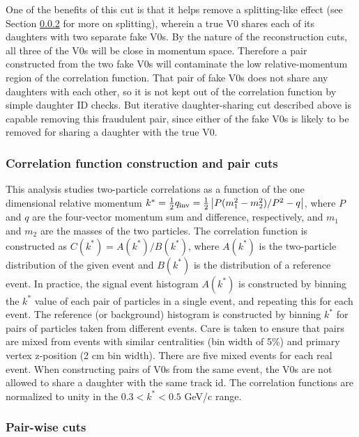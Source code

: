 
One of the benefits of this cut is that it helps remove a splitting-like effect (see Section \ref{sec:PairWiseCuts} for more on splitting), wherein a true V0 shares each of its daughters with two separate fake V0s.  
By the nature of the reconstruction cuts, all three of the V0s will be close in momentum space.  
Therefore a pair constructed from the two fake V0s will contaminate the low relative-momentum region of the correlation function.  
That pair of fake V0s does not share any daughters with each other, so it is not kept out of the correlation function by simple daughter ID checks.  
But iterative daughter-sharing cut described above is capable removing this fraudulent pair, since either of the fake V0s is likely to be removed for sharing a daughter with the true V0.


\subsubsection{Correlation function construction and pair cuts}
\label{sec:CFconstruct}

This analysis studies two-particle correlations as a function of the one dimensional relative momentum $k^*=\frac{1}{2}q_{\mathrm{inv}}=\frac{1}{2}\left\lvert P(m^2_1-m^2_2)/P^2 - q\right\rvert$, where $P$ and $q$ are the four-vector momentum sum and difference, respectively, and $m_1$ and $m_2$ are the masses of the two particles.  
The correlation function is constructed as $C(k^*) = A(k^*)/B(k^*)$, where $A(k^*)$ is the two-particle distribution of the given event and $B(k^*)$ is the distribution of a reference event.  
In practice, the signal event histogram $A(k^*)$ is constructed by binning the $k^*$ value of each pair of particles in a single event, and repeating this for each event.  
The reference (or background) histogram is constructed by binning $k^*$ for pairs of particles taken from different events.  
Care is taken to ensure that pairs are mixed from events with similar centralities (bin width of 5\%) and primary vertex z-position (2 cm bin width).  
There are five mixed events for each real event.  
When constructing pairs of V0s from the same event, the V0s are not allowed to share a daughter with the same track id. 
The correlation functions are normalized to unity in the $ 0.3 < k^* < 0.5$ GeV/c range.

\subsubsection{Pair-wise cuts}
\label{sec:PairWiseCuts}

